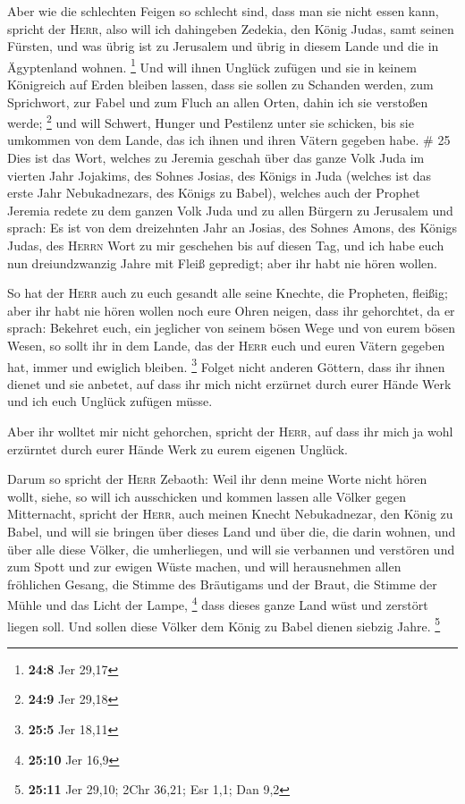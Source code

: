  Aber wie die schlechten Feigen so schlecht sind, dass man
sie nicht essen kann, spricht der \textsc{Herr}, also will ich
dahingeben Zedekia, den König Judas, samt seinen Fürsten, und was übrig
ist zu Jerusalem und übrig in diesem Lande und die in Ägyptenland
wohnen. \footnote{\textbf{24:8} Jer 29,17}  Und will ihnen
Unglück zufügen und sie in keinem Königreich auf Erden bleiben lassen,
dass sie sollen zu Schanden werden, zum Sprichwort, zur Fabel und zum
Fluch an allen Orten, dahin ich sie verstoßen werde; \footnote{\textbf{24:9}
  Jer 29,18}  und will Schwert, Hunger und Pestilenz
unter sie schicken, bis sie umkommen von dem Lande, das ich ihnen und
ihren Vätern gegeben habe. \# 25  Dies ist das Wort,
welches zu Jeremia geschah über das ganze Volk Juda im vierten Jahr
Jojakims, des Sohnes Josias, des Königs in Juda (welches ist das erste
Jahr Nebukadnezars, des Königs zu Babel),  welches auch
der Prophet Jeremia redete zu dem ganzen Volk Juda und zu allen Bürgern
zu Jerusalem und sprach:  Es ist von dem dreizehnten Jahr
an Josias, des Sohnes Amons, des Königs Judas, des \textsc{Herrn} Wort
zu mir geschehen bis auf diesen Tag, und ich habe euch nun
dreiundzwanzig Jahre mit Fleiß gepredigt; aber ihr habt nie hören
wollen.

 So hat der \textsc{Herr} auch zu euch gesandt alle seine
Knechte, die Propheten, fleißig; aber ihr habt nie hören wollen noch
eure Ohren neigen, dass ihr gehorchtet,  da er sprach:
Bekehret euch, ein jeglicher von seinem bösen Wege und von eurem bösen
Wesen, so sollt ihr in dem Lande, das der \textsc{Herr} euch und euren
Vätern gegeben hat, immer und ewiglich bleiben. \footnote{\textbf{25:5}
  Jer 18,11}  Folget nicht anderen Göttern, dass ihr ihnen
dienet und sie anbetet, auf dass ihr mich nicht erzürnet durch eurer
Hände Werk und ich euch Unglück zufügen müsse.

 Aber ihr wolltet mir nicht gehorchen, spricht der
\textsc{Herr}, auf dass ihr mich ja wohl erzürntet durch eurer Hände
Werk zu eurem eigenen Unglück.

 Darum so spricht der \textsc{Herr} Zebaoth: Weil ihr denn
meine Worte nicht hören wollt,  siehe, so will ich
ausschicken und kommen lassen alle Völker gegen Mitternacht, spricht der
\textsc{Herr}, auch meinen Knecht Nebukadnezar, den König zu Babel, und
will sie bringen über dieses Land und über die, die darin wohnen, und
über alle diese Völker, die umherliegen, und will sie verbannen und
verstören und zum Spott und zur ewigen Wüste machen,  und
will herausnehmen allen fröhlichen Gesang, die Stimme des Bräutigams und
der Braut, die Stimme der Mühle und das Licht der Lampe, \footnote{\textbf{25:10}
  Jer 16,9}  dass dieses ganze Land wüst und zerstört
liegen soll. Und sollen diese Völker dem König zu Babel dienen siebzig
Jahre. \footnote{\textbf{25:11} Jer 29,10; 2Chr 36,21; Esr 1,1; Dan 9,2}

